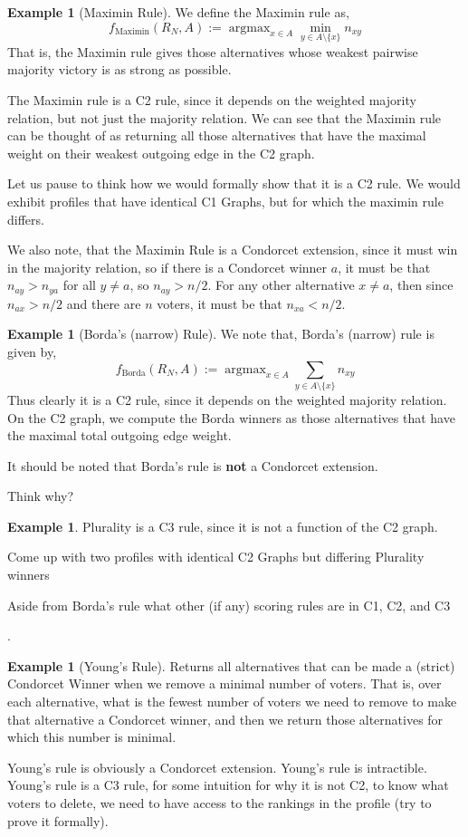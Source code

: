 \documentclass{book}
\newcommand{\unclear}[1]{%
  \par\noindent
  \colorbox{yellow!30}{#1}\par
}
\theoremstyle{plain}
\theoremstyle{definition}
\newtheorem{example}[theorem]{Example}
\theoremstyle{remark}
\begin{document}
\begin{example}[Maximin Rule]
    We define the Maximin rule as, 
    \[
        f_{\text{Maximin}}(R_N, A) := \operatorname{argmax}_{x \in A} \min_{y \in A \setminus \{x\}} n_{xy}
    \]
    That is, the Maximin rule gives those alternatives whose weakest pairwise majority victory is as strong as possible.

    The Maximin rule is a C2 rule, since it depends on the weighted majority relation, but not just the majority relation.
    We can see that the Maximin rule can be thought of as returning all those alternatives that have the maximal weight
    on their weakest outgoing edge in the C2 graph.

    Let us pause to think how we would formally show that it is a C2 rule.
    We would exhibit profiles that have identical 
    C1 Graphs, but for which the maximin rule differs.

    We also note, that the Maximin Rule is a Condorcet extension, 
    since it must win in the majority relation, so 
    if there is a Condorcet winner $a$, it must be that 
    $n_{ay} > n_{ya}$ for all $y \neq a$, so 
    $n_{ay} > n/2$.
    For any other alternative $x \neq a$, 
    then since $n_{ax} > n/2$
    and there are $n$ voters, it must be that $n_{xa} < n/2$.
\end{example}

\begin{example}[Borda's (narrow) Rule]
    We note that, 
    Borda's (narrow) rule is given by, 
    \[
        f_{\text{Borda}}(R_N, A) := \operatorname{argmax}_{x \in A} \sum_{y \in A \setminus \{x\}} n_{xy}
    \] 
    Thus clearly it is a C2 rule, since it depends on the weighted majority relation.
    On the C2 graph, we compute the Borda winners as those 
    alternatives that have the maximal total outgoing edge weight.

    It should be noted that Borda's
    rule is \textbf{not} a Condorcet extension.
    \unclear{Think why?}
\end{example}

\begin{example}
    Plurality is a C3 rule, since it is not a function of the C2 graph.
    \unclear{Come up with two profiles with identical 
    C2 Graphs but differing Plurality winners}
    \unclear{Aside from Borda's rule what other (if any) scoring rules are in C1, C2, and C3}.
\end{example}

\begin{example}[Young's Rule]
    Returns all alternatives that can be made a (strict) Condorcet Winner
    when we remove a minimal number of voters.
    That is, over each alternative, what is the fewest number of 
    voters we need to remove to make that alternative a Condorcet winner,
    and then we return those alternatives for which this number is minimal.

    Young's rule is obviously a Condorcet extension.
    Young's rule is intractible.
    Young's rule is a C3 rule, for some intuition for why it is not 
    C2, to know what voters to delete, we need to have access to the 
    rankings in the profile (try to prove it formally).
\end{example}
\end{document}
